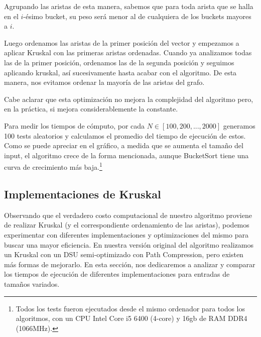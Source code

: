 \vspace{1em}

Agrupando las aristas de esta manera, sabemos que para toda arista que se halla en el $i$-ésimo bucket, su peso será menor al de cualquiera de los buckets mayores a $i$.

\vspace{1em}

Luego ordenamos las aristas de la primer posición del vector y empezamos a aplicar Kruskal con las primeras aristas ordenadas. Cuando ya analizamos todas las de la primer posición, ordenamos las de la segunda posición y seguimos aplicando kruskal, así sucesivamente hasta acabar con el algoritmo. De esta manera, nos evitamos ordenar la mayoría de las aristas del grafo.

\vspace{1em}

Cabe aclarar que esta optimización no mejora la complejidad del algoritmo pero, en la práctica, si mejora considerablemente la constante. 

\vspace{1em}
Para medir los tiempos de cómputo, por cada $N \in [100, 200,..., 2000]$ generamos 100 tests aleatorios y calculamos el promedio del tiempo de ejecución de estos. Como se puede apreciar en el gráfico, a medida que se aumenta el tamaño del input, el algoritmo crece de la forma mencionada, aunque BucketSort tiene una curva de crecimiento más baja.\footnote{Todos los tests fueron ejecutados desde el mismo ordenador para todos los algoritmos, con un CPU Intel Core i5 6400 (4-core) y 16gb de RAM DDR4 (1066MHz).}



\newpage
\subsection{Implementaciones de Kruskal}
\vspace{1em}

Observando que el verdadero costo computacional de nuestro algoritmo proviene de realizar Kruskal (y el correspondiente ordenamiento de las aristas), podemos experimentar con diferentes implementaciones y optimizaciones del mismo para buscar una mayor eficiencia. En nuestra versión original del algoritmo realizamos un Kruskal con un DSU semi-optimizado con Path Compression, pero existen más formas de mejorarlo. En esta sección, nos dedicaremos a analizar y comparar los tiempos de ejecución de diferentes implementaciones para entradas de tamaños variados.

